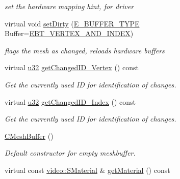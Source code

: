 \begin{DoxyCompactItemize}
\begin{DoxyCompactList}\small\item\em set the hardware mapping hint, for driver \end{DoxyCompactList}\item 
\mbox{\label{classirr_1_1scene_1_1CMeshBuffer_a7afead32226650c724f13f6f61282810}} 
virtual void \hyperlink{classirr_1_1scene_1_1CMeshBuffer_a7afead32226650c724f13f6f61282810}{set\+Dirty} (\hyperlink{namespaceirr_1_1scene_a8f59a89ffef0ad8e5b2c2cb874a93e8c}{E\+\_\+\+B\+U\+F\+F\+E\+R\+\_\+\+T\+Y\+PE} Buffer=\hyperlink{namespaceirr_1_1scene_a8f59a89ffef0ad8e5b2c2cb874a93e8ca34ea664123fbc28610408e51b014dcdd}{E\+B\+T\+\_\+\+V\+E\+R\+T\+E\+X\+\_\+\+A\+N\+D\+\_\+\+I\+N\+D\+EX})
\begin{DoxyCompactList}\small\item\em flags the mesh as changed, reloads hardware buffers \end{DoxyCompactList}\item 
virtual \hyperlink{namespaceirr_a0416a53257075833e7002efd0a18e804}{u32} \hyperlink{classirr_1_1scene_1_1CMeshBuffer_a99abc7d5f5a9f34221c58a598b33ce3a}{get\+Changed\+I\+D\+\_\+\+Vertex} () const
\begin{DoxyCompactList}\small\item\em Get the currently used ID for identification of changes. \end{DoxyCompactList}\item 
virtual \hyperlink{namespaceirr_a0416a53257075833e7002efd0a18e804}{u32} \hyperlink{classirr_1_1scene_1_1CMeshBuffer_aec6786022abd81ddf8d4e79a23628944}{get\+Changed\+I\+D\+\_\+\+Index} () const
\begin{DoxyCompactList}\small\item\em Get the currently used ID for identification of changes. \end{DoxyCompactList}\item 
\mbox{\label{classirr_1_1scene_1_1CMeshBuffer_aa2a6fa9d2f7b23fad0d8a86c74a56944}} 
\hyperlink{classirr_1_1scene_1_1CMeshBuffer_aa2a6fa9d2f7b23fad0d8a86c74a56944}{C\+Mesh\+Buffer} ()
\begin{DoxyCompactList}\small\item\em Default constructor for empty meshbuffer. \end{DoxyCompactList}\item 
virtual const \hyperlink{classirr_1_1video_1_1SMaterial}{video\+::\+S\+Material} \& \hyperlink{classirr_1_1scene_1_1CMeshBuffer_a3e971800b0fc1a67134f839309589e43}{get\+Material} () const

\end{DoxyCompactItemize}
